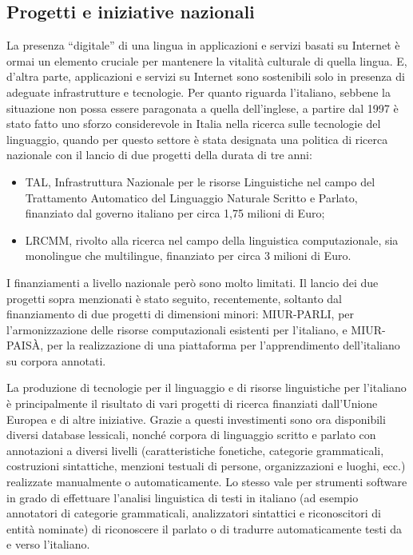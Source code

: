 \begin{multicols}{2}
\subsection{Progetti e iniziative nazionali}

La presenza “digitale” di una lingua in applicazioni e servizi basati su Internet \`{e} ormai un elemento cruciale per mantenere la vitalit\`{a} culturale di quella lingua. E, d'altra parte, applicazioni e servizi su Internet sono sostenibili solo in presenza di adeguate infrastrutture e tecnologie. Per quanto riguarda l'italiano, sebbene la situazione non possa essere paragonata a quella dell'inglese, a partire dal 1997 \`{e} stato fatto uno sforzo considerevole in Italia nella ricerca sulle tecnologie del linguaggio, quando per questo settore \`{e} stata designata una politica di ricerca nazionale con il lancio di due progetti della durata di tre anni:

\begin{itemize}
\item TAL, Infrastruttura Nazionale per le risorse Linguistiche nel campo del Trattamento Automatico del Linguaggio Naturale Scritto e Parlato, finanziato dal governo italiano per circa 1,75 milioni di Euro;
\item LRCMM, rivolto alla ricerca nel campo della linguistica computazionale, sia monolingue che multilingue, finanziato per circa 3 milioni di Euro.
\end{itemize}

I finanziamenti a livello nazionale per\`{o} sono molto limitati. Il lancio dei due progetti sopra menzionati \`{e} stato seguito, recentemente, soltanto dal finanziamento di due progetti di dimensioni minori: MIUR-PARLI, per l'armonizzazione delle risorse computazionali esistenti per l'italiano, e MIUR-PAIS\`{A}, per la realizzazione di una piattaforma per l'apprendimento dell'italiano su corpora annotati.

La produzione di tecnologie per il linguaggio e di risorse linguistiche per l'italiano \`{e} principalmente il risultato di vari progetti di ricerca finanziati dall'Unione Europea e di altre iniziative. Grazie a questi investimenti sono ora disponibili diversi database lessicali, nonch\'{e} corpora di linguaggio scritto e parlato con annotazioni a diversi livelli (caratteristiche fonetiche, categorie grammaticali, costruzioni sintattiche, menzioni testuali di persone, organizzazioni e luoghi, ecc.) realizzate manualmente o automaticamente. Lo stesso vale per strumenti software in grado di effettuare l'analisi linguistica di testi in italiano (ad esempio annotatori di categorie grammaticali, analizzatori sintattici e riconoscitori di entit\`{a} nominate) di riconoscere il parlato o di tradurre automaticamente testi da e verso l'italiano.


\end{multicols}
